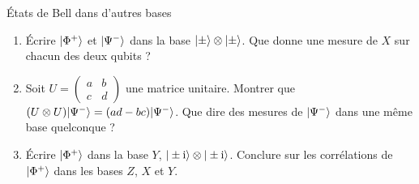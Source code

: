 \begin{exercice}{États de Bell dans d'autres bases}\label{ex:bellX}
\begin{enumerate}[label=\arabic*.,nosep]
  \item Écrire $|\Phi^+\rangle$ et $|\Psi^-\rangle$ dans la base $|\pm\rangle\otimes|\pm\rangle$. Que donne une
        mesure de $X$ sur chacun des deux qubits ?
  \item Soit $U=\begin{pmatrix}a&b\\c&d\end{pmatrix}$ une matrice unitaire. Montrer que
        $(U\otimes U)|\Psi^-\rangle=(ad-bc)|\Psi^-\rangle$. Que dire des mesures de $|\Psi^-\rangle$ dans une
        même base quelconque ?
  \item Écrire $|\Phi^+\rangle$ dans la base $Y$, $|\pm\mathrm{i}\rangle\otimes|\pm\mathrm{i}\rangle$. Conclure sur les
        corrélations de $|\Phi^+\rangle$ dans les bases $Z$, $X$ et $Y$.
\end{enumerate}
\end{exercice}
